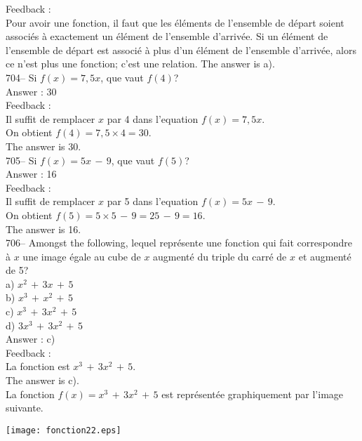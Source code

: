 \documentclass[letterpaper, 12pt]{article}
\begin{document}
Feedback : \\
Pour avoir une fonction, il faut que les \'el\'ements de l'ensemble
de d\'epart soient associ\'es \`a exactement un \'el\'ement de
l'ensemble d'arriv\'ee.  Si un \'el\'ement de l'ensemble de d\'epart
est associ\'e \`a plus d'un \'el\'ement de l'ensemble d'arriv\'ee,
alors ce n'est plus une
fonction; c'est une relation.  The answer is a).\\

704-- Si $f(x)=7,5x$, que vaut $f(4)$?\\

Answer : 30\\

Feedback : \\
Il suffit de remplacer $x$ par 4 dans l'equation $f(x)=7,5x$.  \\
On obtient $f(4)=7,5\times4=30$.\\
The answer is 30.\\

705-- Si $f(x)=5x\,-\,9$, que vaut  $f(5)$?\\

Answer :  16\\

Feedback :  \\
Il suffit de remplacer $x$ par 5 dans l'equation $ f(x)=5x\,-\,9$.\\
On obtient $f(5)=5\times 5\,-\,9=25\,-\,9=16$.\\
The answer is 16.\\

706-- Amongst the following, lequel repr\'esente une fonction qui
fait correspondre \`a $x$ une image \'egale au cube de $x$ augment\'e du
triple du carr\'e de $x$ et augment\'e de 5?\\
a) $x^{2}\,+\,3x \,+\,5$\\
b) $x^{3}\,+\,x^{2}\,+\,5$\\
c) $x^{3}\,+\,3x^{2}\,+\,5$\\
d) $3x^{3}\,+\,3x^{2}\,+\,5$\\

Answer : c)\\

Feedback : \\
La fonction est $x^{3}\,+\,3x^{2}\,+\,5$.\\
The answer is c).\\
La fonction $f(x)=x^{3}\,+\,3x^{2}\,+\,5$ est repr\'esent\'ee graphiquement
par l'image suivante.  \\
    \begin{center}
    \texttt{[image: fonction22.eps]}
    \end{center}
\end{document}
